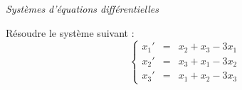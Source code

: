 \documentclass[a4paper,10pt]{report}
\begin{document}
%
%
%
%
%
%

\medskip

\begin{center}
\textit{{ {\large Systèmes d'équations différentielles}}}
\end{center}

\medskip

\begin{Exa} Résoudre le système suivant :
$$\left\{\begin{array}{rcl}
x_1' & = & x_2 + x_3 - 3x_1 \\
x_2' & = & x_3 + x_1 -3 x_2 \\
x_3' &= & x_1 + x_2 -3 x_3\end{array}\right.$$
\end{Exa}
\end{document}
